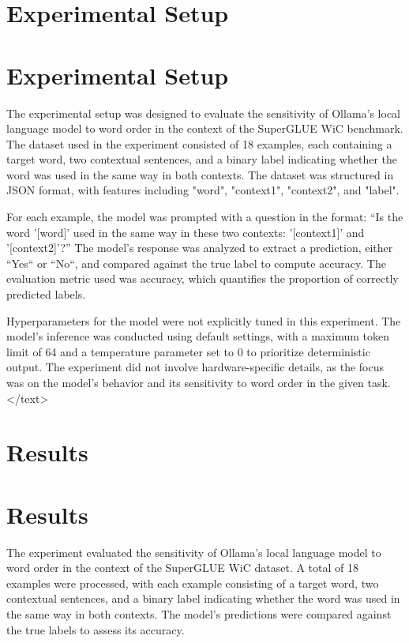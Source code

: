 \documentclass{article}
\begin{document}
\section{Experimental Setup}
\section{Experimental Setup}

The experimental setup was designed to evaluate the sensitivity of Ollama's local language model to word order in the context of the SuperGLUE WiC benchmark. The dataset used in the experiment consisted of 18 examples, each containing a target word, two contextual sentences, and a binary label indicating whether the word was used in the same way in both contexts. The dataset was structured in JSON format, with features including "word", "context1", "context2", and "label". 

For each example, the model was prompted with a question in the format: ``Is the word '[word]' used in the same way in these two contexts: '[context1]' and '[context2]'?'' The model's response was analyzed to extract a prediction, either ``Yes`` or ``No``, and compared against the true label to compute accuracy. The evaluation metric used was accuracy, which quantifies the proportion of correctly predicted labels. 

Hyperparameters for the model were not explicitly tuned in this experiment. The model's inference was conducted using default settings, with a maximum token limit of 64 and a temperature parameter set to 0 to prioritize deterministic output. The experiment did not involve hardware-specific details, as the focus was on the model's behavior and its sensitivity to word order in the given task.
</text>
\section{Results}
\section{Results}

The experiment evaluated the sensitivity of Ollama's local language model to word order in the context of the SuperGLUE WiC dataset. A total of 18 examples were processed, with each example consisting of a target word, two contextual sentences, and a binary label indicating whether the word was used in the same way in both contexts. The model's predictions were compared against the true labels to assess its accuracy.
\end{document}
